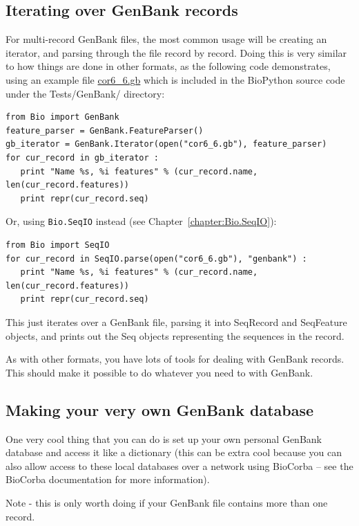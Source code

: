 \documentclass{report}
\begin{document}
\subsection{Iterating over GenBank records}
\label{sec:gb-parsing-iterator}

For multi-record GenBank files, the most common usage will be creating an iterator, and parsing through the file record by record. Doing this is very similar to how things are done in other formats, as the following code demonstrates, using an example file \href{http://biopython.org/SRC/biopython/Tests/GenBank/cor6_6.gb}{cor6\_6.gb} which is included in the BioPython source code under the Tests/GenBank/ directory:

\begin{verbatim}
from Bio import GenBank
feature_parser = GenBank.FeatureParser()
gb_iterator = GenBank.Iterator(open("cor6_6.gb"), feature_parser)
for cur_record in gb_iterator :
   print "Name %s, %i features" % (cur_record.name, len(cur_record.features))
   print repr(cur_record.seq)
\end{verbatim}

Or, using \verb|Bio.SeqIO| instead (see Chapter~\ref{chapter:Bio.SeqIO}):

\begin{verbatim}
from Bio import SeqIO
for cur_record in SeqIO.parse(open("cor6_6.gb"), "genbank") :
   print "Name %s, %i features" % (cur_record.name, len(cur_record.features))
   print repr(cur_record.seq)
\end{verbatim}

This just iterates over a GenBank file, parsing it into SeqRecord and SeqFeature objects, and prints out the Seq objects representing the sequences in the record.

As with other formats, you have lots of tools for dealing with GenBank records. This should make it possible to do whatever you need to with GenBank.

\subsection{Making your very own GenBank database}

One very cool thing that you can do is set up your own personal GenBank database and access it like a dictionary (this can be extra cool because you can also allow access to these local databases over a network using BioCorba -- see the BioCorba documentation for more information).

Note - this is only worth doing if your GenBank file contains more than one record.
\end{document}
